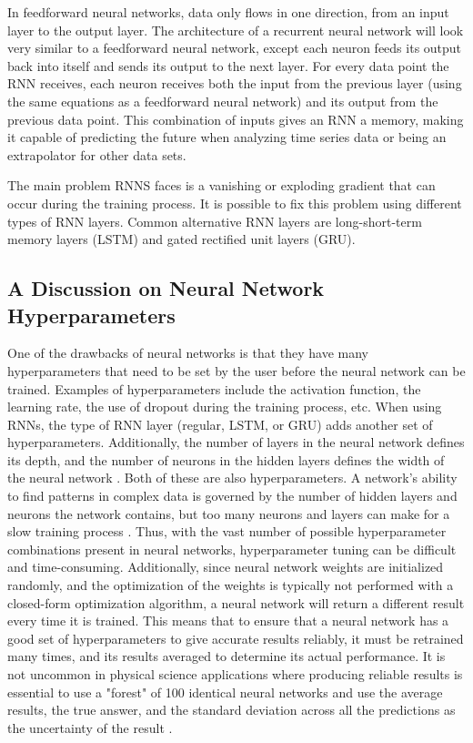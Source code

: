     In feedforward neural networks, data only flows in one direction, from an input layer to the output layer. The architecture of a recurrent neural network will look very similar to a feedforward neural network, except each neuron feeds its output back into itself and sends its output to the next layer. For every data point the RNN receives, each neuron receives both the input from the previous layer (using the same equations as a feedforward neural network) and its output from the previous data point. This combination of inputs gives an RNN a memory, making it capable of predicting the future when analyzing time series data or being an extrapolator for other data sets.

    The main problem RNNS faces is a vanishing or exploding gradient that can occur during the training process. It is possible to fix this problem using different types of RNN layers. Common alternative RNN layers are long-short-term memory layers (LSTM) and gated rectified unit layers (GRU).


\subsection*{A Discussion on Neural Network Hyperparameters}
	One of the drawbacks of neural networks is that they have many hyperparameters that need to be set by the user before the neural network can be trained. Examples of hyperparameters include the activation function, the learning rate, the use of dropout during the training process, etc. When using RNNs, the type of RNN layer (regular, LSTM, or GRU) adds another set of hyperparameters. Additionally, the number of layers in the neural network defines its depth, and the number of neurons in the hidden layers defines the width of the neural network \cite{Ref6}. Both of these are also hyperparameters. A network's ability to find patterns in complex data is governed by the number of hidden layers and neurons the network contains, but too many neurons and layers can make for a slow training process \cite{Ref6}. Thus, with the vast number of possible hyperparameter combinations present in neural networks, hyperparameter tuning can be difficult and time-consuming.
Additionally, since neural network weights are initialized randomly, and the optimization of the weights is typically not performed with a closed-form optimization algorithm, a neural network will return a different result every time it is trained. This means that to ensure that a neural network has a good set of hyperparameters to give accurate results reliably, it must be retrained many times, and its results averaged to determine its actual performance. It is not uncommon in physical science applications where producing reliable results is essential to use a "forest" of 100 identical neural networks and use the average results, the true answer, and the standard deviation across all the predictions as the uncertainty of the result \cite{Ref6}.

